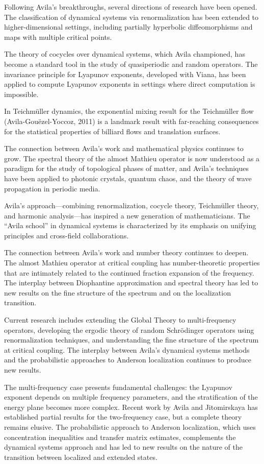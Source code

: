 Following Avila's breakthroughs, several directions of research have been opened. The classification of dynamical systems via renormalization has been extended to higher-dimensional settings, including partially hyperbolic diffeomorphisms and maps with multiple critical points.

The theory of cocycles over dynamical systems, which Avila championed, has become a standard tool in the study of quasiperiodic and random operators. The invariance principle for Lyapunov exponents, developed with Viana, has been applied to compute Lyapunov exponents in settings where direct computation is impossible.

In Teichm\"{u}ller dynamics, the exponential mixing result for the Teichm\"{u}ller flow (Avila-Gou\"{e}zel-Yoccoz, 2011) is a landmark result with far-reaching consequences for the statistical properties of billiard flows and translation surfaces.

The connection between Avila's work and mathematical physics continues to grow. The spectral theory of the almost Mathieu operator is now understood as a paradigm for the study of topological phases of matter, and Avila's techniques have been applied to photonic crystals, quantum chaos, and the theory of wave propagation in periodic media.

Avila's approach---combining renormalization, cocycle theory, Teichm\"{u}ller theory, and harmonic analysis---has inspired a new generation of mathematicians. The ``Avila school'' in dynamical systems is characterized by its emphasis on unifying principles and cross-field collaborations.

The connection between Avila's work and number theory continues to deepen. The almost Mathieu operator at critical coupling has number-theoretic properties that are intimately related to the continued fraction expansion of the frequency. The interplay between Diophantine approximation and spectral theory has led to new results on the fine structure of the spectrum and on the localization transition.

Current research includes extending the Global Theory to multi-frequency operators, developing the ergodic theory of random Schr\"{o}dinger operators using renormalization techniques, and understanding the fine structure of the spectrum at critical coupling. The interplay between Avila's dynamical systems methods and the probabilistic approaches to Anderson localization continues to produce new results.

The multi-frequency case presents fundamental challenges: the Lyapunov exponent depends on multiple frequency parameters, and the stratification of the energy plane becomes more complex. Recent work by Avila and Jitomirskaya has established partial results for the two-frequency case, but a complete theory remains elusive. The probabilistic approach to Anderson localization, which uses concentration inequalities and transfer matrix estimates, complements the dynamical systems approach and has led to new results on the nature of the transition between localized and extended states.

